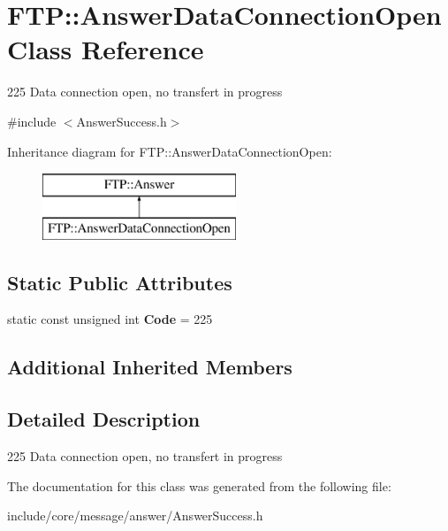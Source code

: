 \hypertarget{class_f_t_p_1_1_answer_data_connection_open}{\section{F\-T\-P\-:\-:Answer\-Data\-Connection\-Open Class Reference}
\label{class_f_t_p_1_1_answer_data_connection_open}
}


225 Data connection open, no transfert in progress  




{\ttfamily \#include $<$Answer\-Success.\-h$>$}

Inheritance diagram for F\-T\-P\-:\-:Answer\-Data\-Connection\-Open\-:\begin{figure}[H]
\begin{center}
\leavevmode
\includegraphics[height=2.000000cm]{class_f_t_p_1_1_answer_data_connection_open}
\end{center}
\end{figure}
\subsection*{Static Public Attributes}
\begin{DoxyCompactItemize}
\item 
\hypertarget{class_f_t_p_1_1_answer_data_connection_open_a883697754f0cebfe3f8f6be47f6461c0}{static const unsigned int {\bfseries Code} = 225}\label{class_f_t_p_1_1_answer_data_connection_open_a883697754f0cebfe3f8f6be47f6461c0}

\end{DoxyCompactItemize}
\subsection*{Additional Inherited Members}


\subsection{Detailed Description}
225 Data connection open, no transfert in progress 

The documentation for this class was generated from the following file\-:\begin{DoxyCompactItemize}
\item 
include/core/message/answer/Answer\-Success.\-h\end{DoxyCompactItemize}

